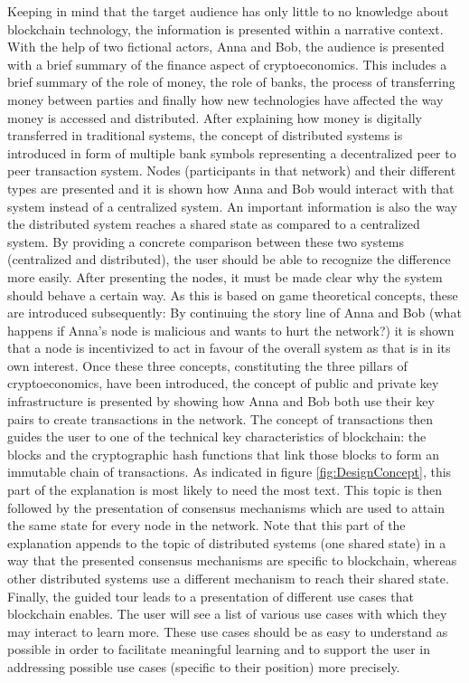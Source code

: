 Keeping in mind that the target audience has only little to no knowledge about blockchain technology, the information is presented within a narrative context. With the help of two fictional actors, Anna and Bob, the audience is presented with a brief summary of the finance aspect of cryptoeconomics. This includes a brief summary of the role of money, the role of banks, the process of transferring money between parties and finally how new technologies have affected the way money is accessed and distributed. After explaining how money is digitally transferred in traditional systems, the concept of distributed systems is introduced in form of multiple bank symbols representing a decentralized peer to peer transaction system. Nodes (participants in that network) and their different types are presented and it is shown how Anna and Bob would interact with that system instead of a centralized system. An important information is also the way the distributed system reaches a shared state as compared to a centralized system. By providing a concrete comparison between these two systems (centralized and distributed), the user should be able to recognize the difference more easily. After presenting the nodes, it must be made clear why the system should behave a certain way. As this is based on game theoretical concepts, these are introduced subsequently: By continuing the story line of Anna and Bob (what happens if Anna's node is malicious and wants to hurt the network?) it is shown that a node is incentivized to act in favour of the overall system as that is in its own interest. Once these three concepts, constituting the three pillars of cryptoeconomics, have been introduced, the concept of public and private key infrastructure is presented by showing how Anna and Bob both use their key pairs to create transactions in the network. The concept of transactions then guides the user to one of the technical key characteristics of blockchain: the blocks and the cryptographic hash functions that link those blocks to form an immutable chain of transactions. As indicated in figure \ref{fig:DesignConcept}, this part of the explanation is most likely to need the most text. This topic is then followed by the presentation of consensus mechanisms which are used to attain the same state for every node in the network. Note that this part of the explanation appends to the topic of distributed systems (one shared state) in a way that the presented consensus mechanisms are specific to blockchain, whereas other distributed systems use a different mechanism to reach their shared state. Finally, the guided tour leads to a presentation of different use cases that blockchain enables. The user will see a list of various use cases with which they may interact to learn more. These use cases should be as easy to understand as possible in order to facilitate meaningful learning and to support the user in addressing possible use cases (specific to their position) more precisely.

